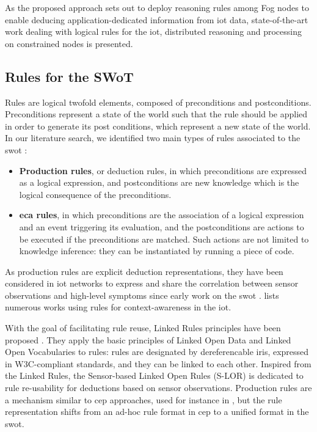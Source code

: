 \documentclass[sw]{iosart2x}
\begin{document}
As the proposed approach sets out to deploy reasoning rules among Fog nodes to enable deducing application-dedicated information from \gls{iot} data, state-of-the-art work dealing with logical rules for the \gls{iot}, distributed reasoning and processing on constrained nodes is presented.

\subsection{Rules for the SWoT}
\label{subs:rules}

Rules are logical twofold elements, composed of preconditions and postconditions.
Preconditions represent a state of the world such that the rule should be applied in order to generate its post conditions, which represent a new state of the world.
In our literature search, we identified two main types of rules associated to the \gls{swot} \cite{Boley2007}:
\begin{itemize}
	\item \textbf{Production rules}, or deduction rules, in which preconditions are expressed as a logical expression, and postconditions are new knowledge which is the logical consequence of the preconditions.
	\item \textbf{\gls{eca} rules}, in which preconditions are the association of a logical expression and an event triggering its evaluation, and the postconditions are actions to be executed if the preconditions are matched. 
	Such actions are not limited to knowledge inference: they can be instantiated by running a piece of code.
\end{itemize}

As production rules are explicit deduction representations, they have been considered in \gls{iot} networks to express and share the correlation between sensor observations and high-level symptoms since early work on the \gls{swot} \cite{AmitSheth30}.
\cite{Sezer2018} lists numerous works using rules for context-awareness in the \gls{iot}.

With the goal of facilitating rule reuse, Linked Rules principles have been proposed \cite{Khandelwal2011}. 
They apply the basic principles of Linked Open Data and Linked Open Vocabularies to rules: rules are designated by dereferencable \gls{iri}s, expressed in W3C-compliant standards, and they can be linked to each other.
Inspired from the Linked Rules, the Sensor-based Linked Open Rules (S-LOR) \cite{Gyrard2017} is dedicated to rule re-usability for deductions based on sensor observations.
Production rules are a mechanism similar to \gls{cep} approaches, used for instance in \cite{ZangLi55}, but the rule representation shifts from an ad-hoc rule format in \gls{cep} to a unified format in the \gls{swot}. 
\end{document}
